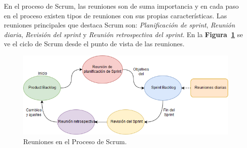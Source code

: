 En el proceso de Scrum, las reuniones son de suma importancia y en cada paso en el proceso existen tipos de reuniones con sus propias características. Las reuniones principales que destaca Scrum son: \emph{Planificación de sprint}, \emph{Reunión diaria}, \emph{Revisión del sprint} y \emph{Reunión retrospectiva del sprint}. En la \textbf{Figura~\ref{fig: reunionesScrum}} se ve el ciclo de Scrum desde el punto de vista de las reuniones.

\begin{figure}[ht!]
    \includegraphics[width=\textwidth]{Imagenes/Reuniones_Scrum.jpg}
    \caption{\label{fig: reunionesScrum} Reuniones en el Proceso de Scrum.}
\end{figure}

